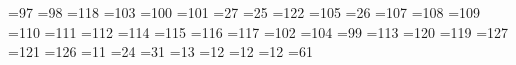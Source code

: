 =97  %
{}=98  %
{}=118 %
{}=103 %
{}=100 %
{}=101 %
{}=27  %
{}=25  %
{}=122 %
{}=105 %
{}=26  %
{}=107 %
{}=108 %
{}=109 %
{}=110 %
{}=111 %
{}=112 %
{}=114 %
{}=115 %
{}=116 %
{}=117 %
{}=102 %
{}=104 %
{}=99  %
{}=113 %
{}=120 %
{}=119 %
{}=127 %
{}=121 %
{}=126 %
{}=11  %
{}=24  %
{}=31  %
=13  %
{}=12 =12 %
{}=12 =61 %
       

